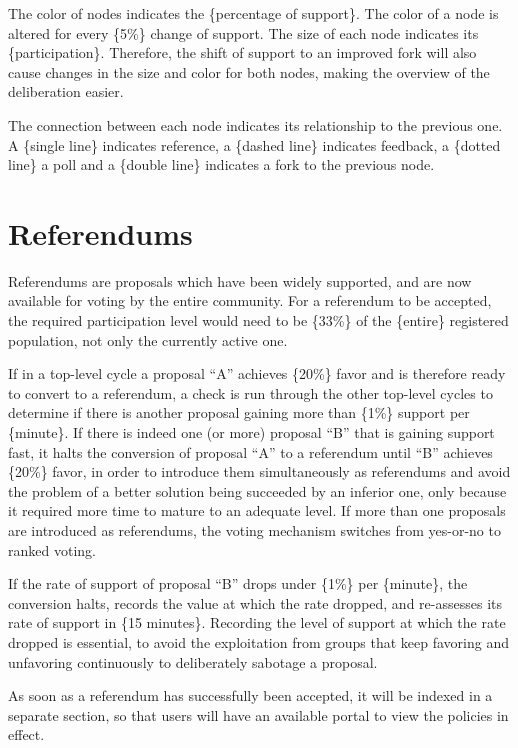 \documentclass[a4paper,11pt]{article}
\begin{document}
\begin{multicols}{2}
The color of nodes indicates the \{percentage of support\}. The color of a node is altered for every \{5\%\} change of support. The size of each node indicates its \{participation\}. Therefore, the shift of support to an improved fork will also cause changes in the size and color for both nodes, making the overview of the deliberation easier.

The connection between each node indicates its relationship to the previous one. A \{single line\} indicates reference, a \{dashed line\} indicates feedback, a \{dotted line\} a poll and a \{double line\} indicates a fork to the previous node.

\section{Referendums} \label{referendums}

Referendums are proposals which have been widely supported, and are now available for voting by the entire community. For a referendum to be accepted, the required participation level would need to be \{33\%\} of the \{entire\} registered population, not only the currently active one.

If in a top-level cycle a proposal “A” achieves \{20\%\} favor and is therefore ready to convert to a referendum, a check is run through the other top-level cycles to determine if there is another proposal gaining more than \{1\%\} support per \{minute\}. If there is indeed one (or more) proposal “B” that is gaining support fast, it halts the conversion of proposal “A” to a referendum until “B” achieves \{20\%\} favor, in order to introduce them simultaneously as referendums and avoid the problem of a better solution being succeeded by an inferior one, only because it required more time to mature to an adequate level. If more than one proposals are introduced as referendums, the voting mechanism switches from yes-or-no to ranked voting.

If the rate of support of proposal “B” drops under \{1\%\} per \{minute\}, the conversion halts, records the value at which the rate dropped, and re-assesses its rate of support in \{15 minutes\}. Recording the level of support at which the rate dropped is essential, to avoid the exploitation from groups that keep favoring and unfavoring continuously to deliberately sabotage a proposal.

As soon as a referendum has successfully been accepted, it will be indexed in a separate section, so that users will have an available portal to view the policies in effect.


\end{multicols}
\end{document}
